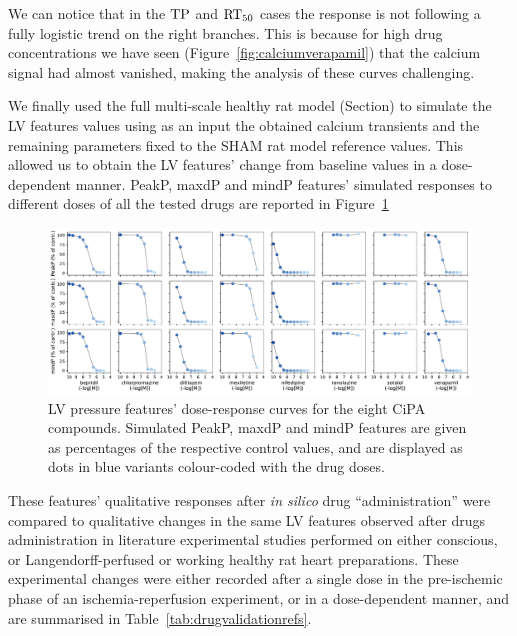 \noindent
We can notice that in the $\textrm{TP}$ and $\textrm{RT}_{50}$ cases the response is not following a fully logistic trend on the right branches. This is because for high drug concentrations we have seen (Figure~\ref{fig:calciumverapamil}) that the calcium signal had almost vanished, making the analysis of these curves challenging.

\vspace{0.2cm}
We finally used the full multi-scale healthy rat model (Section) to simulate the LV features values using as an input the obtained calcium transients and the remaining parameters fixed to the SHAM rat model reference values. This allowed us to obtain the LV features' change from baseline values in a dose-dependent manner. PeakP, maxdP and mindP features' simulated responses to different doses of all the tested drugs are reported in Figure~\ref{fig:LVfeatsalldrugsrespcurves}

\begin{figure}[!ht]
    \myfloatalign
    \includegraphics[width=1\textwidth]{figures/chapter06/lvp_features_responses_to_all_drugs.pdf}
    \caption{LV pressure features' dose-response curves for the eight CiPA compounds. Simulated PeakP, maxdP and mindP features are given as percentages of the respective control values, and are displayed as dots in blue variants colour-coded with the drug doses. }
    \label{fig:LVfeatsalldrugsrespcurves}
\end{figure}

\noindent
These features' qualitative responses after \textit{in silico} drug ``administration'' were compared to qualitative changes in the same LV features observed after drugs administration in literature experimental studies performed on either conscious, or Langendorff-perfused or working healthy rat heart preparations. These experimental changes were either recorded after a single dose in the pre-ischemic phase of an ischemia-reperfusion experiment, or in a dose-dependent manner, and are summarised in Table~\ref{tab:drugvalidationrefs}.

